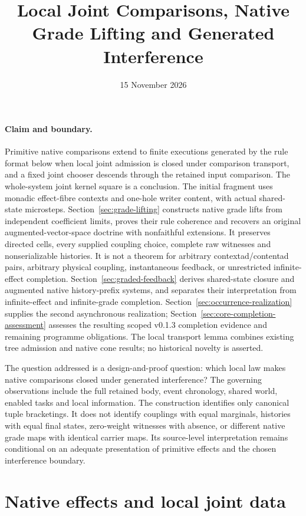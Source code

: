 \documentclass[11pt]{article}
\title{Local Joint Comparisons, Native Grade Lifting and Generated Interference}
\date{15 November 2026}
\begin{document}
\maketitle

\paragraph{Claim and boundary.} Primitive native comparisons extend to finite executions generated by the rule format below when local joint admission is closed under comparison transport, and a fixed joint chooser descends through the retained input comparison. The whole-system joint kernel square is a conclusion. The initial fragment uses monadic effect-fibre contexts and one-hole writer content, with actual shared-state microsteps. Section~\ref{sec:grade-lifting} constructs native grade lifts from independent coefficient limits, proves their rule coherence and recovers an original augmented-vector-space doctrine with nonfaithful extensions. It preserves directed cells, every supplied coupling choice, complete raw witnesses and nonserializable histories. It is not a theorem for arbitrary contextad/contentad pairs, arbitrary physical coupling, instantaneous feedback, or unrestricted infinite-effect completion. Section~\ref{sec:graded-feedback} derives shared-state closure and augmented native history-prefix systems, and separates their interpretation from infinite-effect and infinite-grade completion. Section~\ref{sec:occurrence-realization} supplies the second asynchronous realization; Section~\ref{sec:core-completion-assessment} assesses the resulting scoped v0.1.3 completion evidence and remaining programme obligations. The local transport lemma combines existing tree admission and native cone results; no historical novelty is asserted.

The question addressed is a design-and-proof question: which local law makes native comparisons closed under generated interference? The governing observations include the full retained body, event chronology, shared world, enabled tasks and local information. The construction identifies only canonical tuple bracketings. It does not identify couplings with equal marginals, histories with equal final states, zero-weight witnesses with absence, or different native grade maps with identical carrier maps. Its source-level interpretation remains conditional on an adequate presentation of primitive effects and the chosen interference boundary.

\section{Native effects and local joint data}
\end{document}
